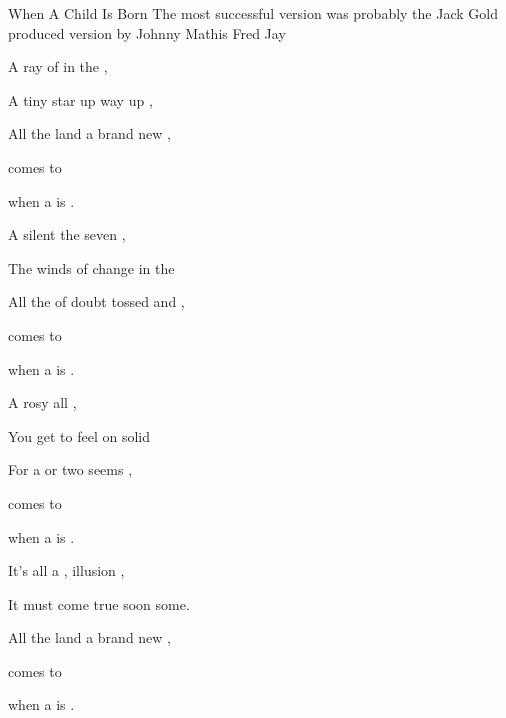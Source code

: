 \begin{SBSong}{When A Child Is Born}
    {The most successful version was probably the Jack Gold produced version by Johnny Mathis}
    {Fred Jay}
  \begin{SBVerse}
	A ray of   in the ,  
	
	A tiny star  up way up ,   
	
	All  the land  a brand new ,
	
	  comes to  

	when a  is .   
  \end{SBVerse}
  \begin{SBVerse}
	A silent   the seven ,  
	
	The winds of change  in the   
	
	All the  of doubt  tossed and ,
	
	  comes to  

	when a  is .   
  \end{SBVerse}
  \begin{SBVerse}
	A rosy   all ,  
	
	You get to feel  on solid    
	
	For a  or two  seems ,
	
	  comes to  

	when a  is .   
  \end{SBVerse}
  \begin{SBVerse}
	It's all a ,  illusion ,  
	
	It must come true  soon some.   
	
	All  the land  a brand new ,
	
	  comes to  

	when a  is .   
  \end{SBVerse}
\end{SBSong}

